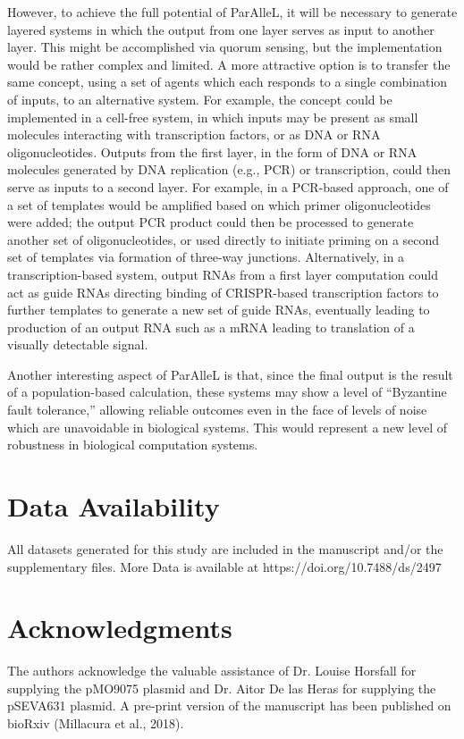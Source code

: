 However, to achieve the full potential of ParAlleL, it will be necessary to generate layered systems in which the output from one layer serves as input to another layer. This might be accomplished via quorum sensing, but the implementation would be rather complex and limited. A more attractive option is to transfer the same concept, using a set of agents which each responds to a single combination of inputs, to an alternative system. For example, the concept could be implemented in a cell-free system, in which inputs may be present as small molecules interacting with transcription factors, or as DNA or RNA oligonucleotides. Outputs from the first layer, in the form of DNA or RNA molecules generated by DNA replication (e.g., PCR) or transcription, could then serve as inputs to a second layer. For example, in a PCR-based approach, one of a set of templates would be amplified based on which primer oligonucleotides were added; the output PCR product could then be processed to generate another set of oligonucleotides, or used directly to initiate priming on a second set of templates via formation of three-way junctions. Alternatively, in a transcription-based system, output RNAs from a first layer computation could act as guide RNAs directing binding of CRISPR-based transcription factors to further templates to generate a new set of guide RNAs, eventually leading to production of an output RNA such as a mRNA leading to translation of a visually detectable signal.

Another interesting aspect of ParAlleL is that, since the final output is the result of a population-based calculation, these systems may show a level of “Byzantine fault tolerance,” allowing reliable outcomes even in the face of levels of noise which are unavoidable in biological systems. This would represent a new level of robustness in biological computation systems.

\section{Data Availability}
All datasets generated for this study are included in the manuscript and/or the supplementary files. More Data is available at https://doi.org/10.7488/ds/2497

\section{Acknowledgments}

The authors acknowledge the valuable assistance of Dr. Louise Horsfall for supplying the pMO9075 plasmid and Dr. Aitor De las Heras for supplying the pSEVA631 plasmid. A pre-print version of the manuscript has been published on bioRxiv (Millacura et al., 2018).
